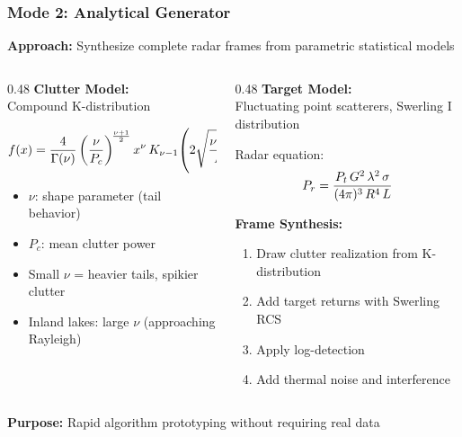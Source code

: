 \documentclass[aspectratio=169, 10pt]{beamer}
\begin{document}
\begin{frame}
  \frametitle{Mode 2: Analytical Generator}

  \textbf{Approach:} Synthesize complete radar frames from parametric statistical models

  \begin{columns}[T]
    \begin{column}{0.48\textwidth}
      \small
      \textbf{Clutter Model:}\\
      Compound K-distribution

      \vspace{0.15cm}
      \begin{equation*}
        \footnotesize
        f(x) = \frac{4}{\Gamma(\nu)} \left(\frac{\nu}{P_c}\right)^{\!\frac{\nu+1}{2}} x^{\nu}\, K_{\nu-1}\!\left(2\sqrt{\frac{\nu\, x^2}{P_c}}\right)
      \end{equation*}

      \setlength{\itemsep}{0pt}
      \begin{itemize}
        \item $\nu$: shape parameter (tail behavior)
        \item $P_c$: mean clutter power
        \item Small $\nu$ = heavier tails, spikier clutter
        \item Inland lakes: large $\nu$ (approaching Rayleigh)
      \end{itemize}
    \end{column}

    \begin{column}{0.48\textwidth}
      \small
      \textbf{Target Model:}\\
      Fluctuating point scatterers, Swerling I distribution

      \vspace{0.15cm}
      Radar equation:
      \begin{equation*}
        \footnotesize
        P_r = \frac{P_t\, G^2\, \lambda^2\, \sigma}{(4\pi)^3\, R^4\, L}
      \end{equation*}

      \vspace{0.2cm}
      \textbf{Frame Synthesis:}
      \setlength{\itemsep}{0pt}
      \begin{enumerate}
        \item Draw clutter realization from K-distribution
        \item Add target returns with Swerling RCS
        \item Apply log-detection
        \item Add thermal noise and interference
      \end{enumerate}
    \end{column}
  \end{columns}

  \vspace{0.2cm}
  \small
  \textbf{Purpose:} Rapid algorithm prototyping without requiring real data
\end{frame}
\end{document}
